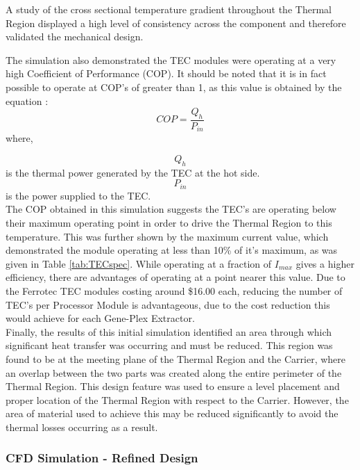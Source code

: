 A study of the cross sectional temperature gradient throughout the Thermal Region displayed a high level of consistency across the component and therefore validated the mechanical design.

The simulation also demonstrated the TEC modules were operating at a very high Coefficient of Performance (COP). It should be noted that it is in fact possible to operate at COP's of greater than 1, as this value is obtained by the equation \cite{Ferroteceff}:
\begin{equation}
COP = \frac{Q_h}{P_{in}}
\end{equation}
where,

$$ Q_h$$ is the thermal power generated by the TEC at the hot side.\\
$$P_{in}$$ is the power supplied to the TEC.\\

The COP obtained in this simulation suggests the TEC's are operating below their maximum operating point in order to drive the Thermal Region to this temperature. This was further shown by the maximum current value, which demonstrated the module operating at less than 10\% of it's maximum, as was given in Table \ref{tab:TECspec}. While operating at a fraction of $I_{max}$ gives a higher efficiency, there are advantages of operating at a point nearer this value. Due to the Ferrotec TEC modules costing around \$16.00 each, reducing the number of TEC's per Processor Module is advantageous, due to the cost reduction this would achieve for each Gene-Plex Extractor.\\

Finally, the results of this initial simulation identified an area through which significant heat transfer was occurring and must be reduced. This region was found to be at the meeting plane of the Thermal Region and the Carrier, where an overlap between the two parts was created along the entire perimeter of the Thermal Region. This design feature was used to ensure a level placement and proper location of the Thermal Region with respect to the Carrier. However, the area of material used to achieve this may be reduced significantly to avoid the thermal losses occurring as a result.\\

\subsubsection{CFD Simulation - Refined Design}
\label{refinedcfd}


